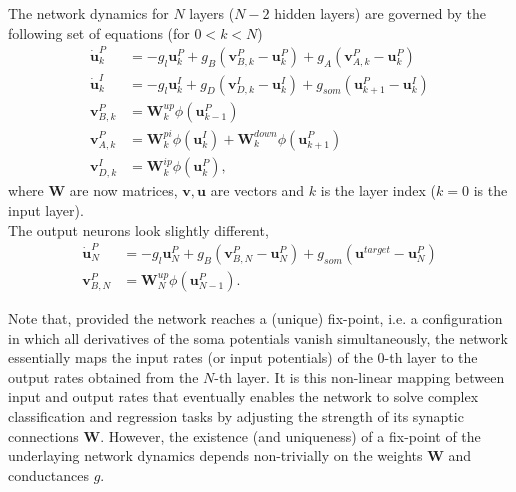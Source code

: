 \documentclass[12pt,a4paper]{article}
\begin{document}
The network dynamics for $N$ layers ($N-2$ hidden layers) are governed by the following set of equations (for $0<k<N$) 
\begin{align}
\dot{\bm{u}}^P_k &= -g_l\bm{u}^P_k + g_B(\bm{v}^P_{B,k} - \bm{u}^P_k) + g_A(\bm{v}^P_{A,k} - \bm{u}^P_k)\\
\dot{\bm{u}}^I_k &= -g_l\bm{u}^I_k + g_D(\bm{v}^I_{D,k} - \bm{u}^I_k) + g_{som}(\bm{u}^P_{k+1} - \bm{u}^I_k)\\
\bm{v}^P_{B,k} &= \bm{W}^{up}_k\phi(\bm{u}^P_{k-1})\\
\bm{v}^P_{A,k} &= \bm{W}^{pi}_k\phi(\bm{u}^I_{k}) + \bm{W}^{down}_k\phi(\bm{u}^P_{k+1})\\\label{eq:apical}
\bm{v}^I_{D,k} &= \bm{W}^{ip}_k\phi(\bm{u}^P_{k}),
\end{align}
where $\bm{W}$ are now matrices, $\bm{v},\bm{u}$ are vectors and $k$ is the layer index ($k=0$ is the input layer).\\
The output neurons look slightly different,
\begin{align}
\dot{\bm{u}}^P_N &= -g_l\bm{u}^P_N + g_B(\bm{v}^P_{B,N} - \bm{u}^P_N) + g_{som}(\bm{u}^{target} - \bm{u}^P_N)\\
\bm{v}^P_{B,N} &= \bm{W}^{up}_N\phi(\bm{u}^P_{N-1}).
\end{align}

Note that, provided the network reaches a (unique) fix-point, i.e. a configuration in which all derivatives of the soma potentials vanish simultaneously, the network essentially maps the input rates (or input potentials) of the $0$-th layer to the output rates obtained from the $N$-th layer. It is this non-linear mapping between input and output rates that eventually enables the network to solve complex classification and regression tasks by adjusting the strength of its synaptic connections $\bm{W}$. However, the existence (and uniqueness) of a fix-point of the underlaying network dynamics depends non-trivially on the weights $\bm{W}$ and conductances $g$. 
\end{document}
